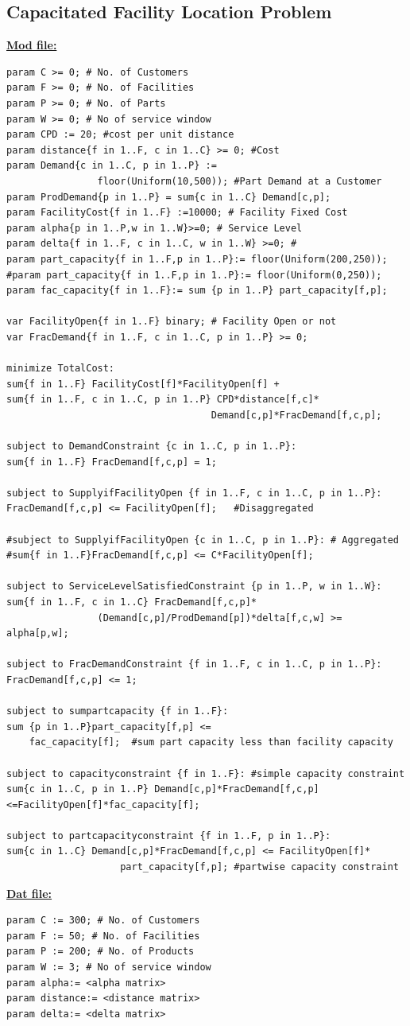 \documentclass[12pt]{article}
\numberwithin{equation}{section}
\begin{document}
\subsection{Capacitated Facility Location Problem}
\textbf{\underline{Mod file:}}
\begin{verbatim}
param C >= 0; # No. of Customers
param F >= 0; # No. of Facilities
param P >= 0; # No. of Parts
param W >= 0; # No of service window
param CPD := 20; #cost per unit distance
param distance{f in 1..F, c in 1..C} >= 0; #Cost
param Demand{c in 1..C, p in 1..P} := 
                floor(Uniform(10,500)); #Part Demand at a Customer
param ProdDemand{p in 1..P} = sum{c in 1..C} Demand[c,p];
param FacilityCost{f in 1..F} :=10000; # Facility Fixed Cost
param alpha{p in 1..P,w in 1..W}>=0; # Service Level
param delta{f in 1..F, c in 1..C, w in 1..W} >=0; #
param part_capacity{f in 1..F,p in 1..P}:= floor(Uniform(200,250));
#param part_capacity{f in 1..F,p in 1..P}:= floor(Uniform(0,250));
param fac_capacity{f in 1..F}:= sum {p in 1..P} part_capacity[f,p];

var FacilityOpen{f in 1..F} binary; # Facility Open or not
var FracDemand{f in 1..F, c in 1..C, p in 1..P} >= 0;

minimize TotalCost:
sum{f in 1..F} FacilityCost[f]*FacilityOpen[f] + 
sum{f in 1..F, c in 1..C, p in 1..P} CPD*distance[f,c]*
                                    Demand[c,p]*FracDemand[f,c,p];

subject to DemandConstraint {c in 1..C, p in 1..P}:
sum{f in 1..F} FracDemand[f,c,p] = 1;

subject to SupplyifFacilityOpen {f in 1..F, c in 1..C, p in 1..P}: 
FracDemand[f,c,p] <= FacilityOpen[f];   #Disaggregated

#subject to SupplyifFacilityOpen {c in 1..C, p in 1..P}: # Aggregated
#sum{f in 1..F}FracDemand[f,c,p] <= C*FacilityOpen[f];

subject to ServiceLevelSatisfiedConstraint {p in 1..P, w in 1..W}:
sum{f in 1..F, c in 1..C} FracDemand[f,c,p]*
                (Demand[c,p]/ProdDemand[p])*delta[f,c,w] >= alpha[p,w];

subject to FracDemandConstraint {f in 1..F, c in 1..C, p in 1..P}:
FracDemand[f,c,p] <= 1;

subject to sumpartcapacity {f in 1..F}: 
sum {p in 1..P}part_capacity[f,p] <= 
    fac_capacity[f];  #sum part capacity less than facility capacity

subject to capacityconstraint {f in 1..F}: #simple capacity constraint
sum{c in 1..C, p in 1..P} Demand[c,p]*FracDemand[f,c,p]                                                          <=FacilityOpen[f]*fac_capacity[f];

subject to partcapacityconstraint {f in 1..F, p in 1..P}: 
sum{c in 1..C} Demand[c,p]*FracDemand[f,c,p] <= FacilityOpen[f]*
                    part_capacity[f,p]; #partwise capacity constraint
\end{verbatim}
\textbf{\underline{Dat file:}}
\begin{verbatim}
param C := 300; # No. of Customers
param F := 50; # No. of Facilities
param P := 200; # No. of Products
param W := 3; # No of service window
param alpha:= <alpha matrix>
param distance:= <distance matrix>
param delta:= <delta matrix>
\end{verbatim}
\end{document}
